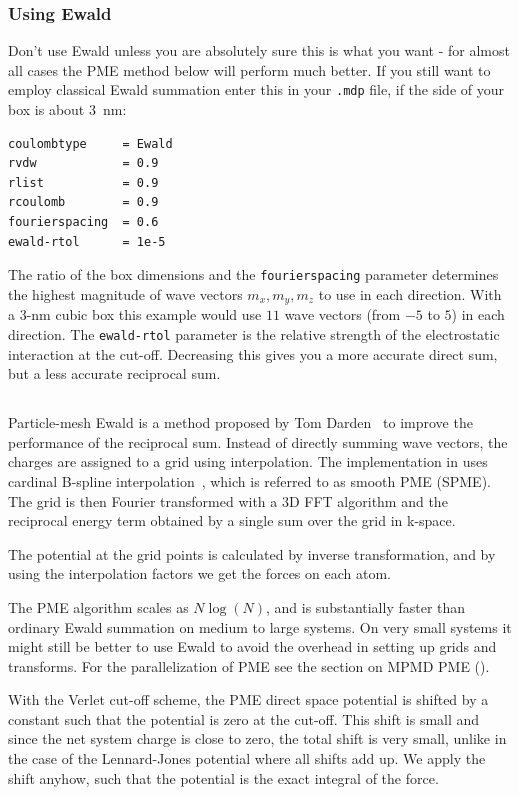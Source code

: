 \subsubsection{Using Ewald}
Don't use Ewald unless you are absolutely sure this is what you want -
for almost all cases the PME method below will perform much better.
If you still want to employ classical Ewald summation enter this in
your {\tt .mdp} file, if the side of your box is about $3$~nm:

\begin{verbatim}
coulombtype     = Ewald
rvdw            = 0.9
rlist           = 0.9
rcoulomb        = 0.9
fourierspacing  = 0.6
ewald-rtol      = 1e-5
\end{verbatim}

The ratio of the box dimensions and the {\tt fourierspacing} parameter determines
the highest magnitude of wave vectors $m_x,m_y,m_z$ to use in each
direction. With a 3-nm cubic box this example would use $11$ wave vectors
(from $-5$ to $5$) in each direction.  The {\tt ewald-rtol} parameter
is the relative strength of the electrostatic interaction at the
cut-off. Decreasing this gives you a more accurate direct sum, but a
less accurate reciprocal sum.

\subsection{}
\label{sec:pme}
Particle-mesh Ewald is a method proposed by Tom
Darden~\cite{Darden93} to improve the performance of the
reciprocal sum. Instead of directly summing wave vectors, the charges
are assigned to a grid using interpolation. The implementation in
{\gromacs} uses cardinal B-spline interpolation~\cite{Essmann95},
which is referred to as smooth PME (SPME).
The grid is then Fourier transformed with a 3D FFT algorithm and the
reciprocal energy term obtained by a single sum over the grid in
k-space.

The potential at the grid points is calculated by inverse
transformation, and by using the interpolation factors we get the
forces on each atom.

The PME algorithm scales as $N \log(N)$, and is substantially faster
than ordinary Ewald summation on medium to large systems. On very
small systems it might still be better to use Ewald to avoid the
overhead in setting up grids and transforms.
For the parallelization of PME see the section on MPMD PME ().

With the Verlet cut-off scheme, the PME direct space potential is
shifted by a constant such that the potential is zero at the
cut-off. This shift is small and since the net system charge is close
to zero, the total shift is very small, unlike in the case of the
Lennard-Jones potential where all shifts add up. We apply the shift
anyhow, such that the potential is the exact integral of the force.

